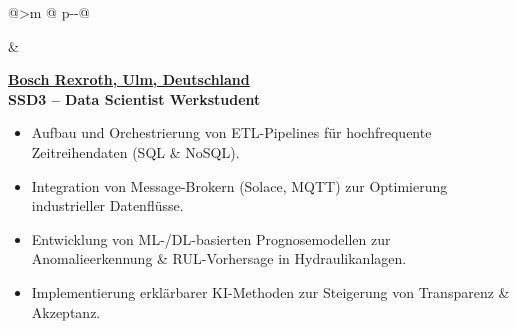 \newlength{\datecol}
\setlength{\datecol}{2.7cm}   %

\newlength{\colgap}
\setlength{\colgap}{6mm}      %


\begin{tabular}{@{}>{\raggedleft\arraybackslash}m{\datecol} @{\hspace{\colgap}} p{\dimexpr\textwidth-\datecol-\colgap\relax}@{}}


 &
\begin{minipage}[t]{\linewidth}\vspace{0pt}
\begin{expblock}
  \footnotesize
  \setlength{\parindent}{0pt}\setlength{\parskip}{0pt}
  \textbf{\href{https://www.boschrexroth.com/en/dc/}{Bosch Rexroth, Ulm, Deutschland}}\\[-0.1em]
  \textbf{SSD3 – Data Scientist Werkstudent}\\[-1em]
  \begin{itemize}[nosep,leftmargin=1em]
    \item Aufbau und Orchestrierung von ETL-Pipelines für hochfrequente Zeitreihendaten (SQL \& NoSQL).
    \item Integration von Message-Brokern (Solace, MQTT) zur Optimierung industrieller Datenflüsse.
    \item Entwicklung von ML-/DL-basierten Prognosemodellen zur Anomalieerkennung \& RUL-Vorhersage in Hydraulikanlagen.
    \item Implementierung erklärbarer KI-Methoden zur Steigerung von Transparenz \& Akzeptanz.
  \end{itemize}
\end{expblock}
\end{minipage}
\\[-0.2em]



\end{tabular}
